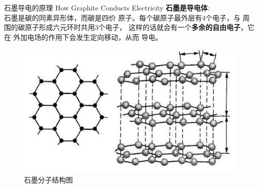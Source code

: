 \documentclass[10pt]{beamer}
\begin{document}
	
	
	
	\begin{frame}{石墨导电的原理 How Graphite Conducts Electricity}
		\textbf{石墨是导电体}:\\
		\qquad 石墨是碳的同素异形体，而碳是四价
		原子。每个碳原子最外层有4个电子，与
		周围的碳原子形成六元环时共用3个电子，
		这样的话就会有一个\textbf{多余的自由电子}，它在
		外加电场的作用下会发生定向移动，从而
		导电。\begin{figure}
			\includegraphics[width=0.6\linewidth]{figs/121}
			\caption{石墨分子结构图}
			\label{fig:f1}
		\end{figure}
	\end{frame}
	
	
	
\end{document}
